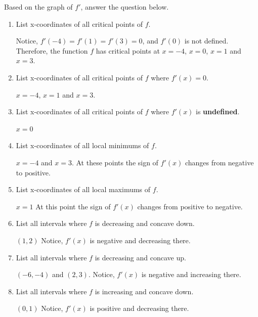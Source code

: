 \documentclass{ximera}
\begin{document}
\begin{problem}
	Based on the graph of $f'$, answer  the question below.\\
	\begin{enumerate}
		\item List x-coordinates of all critical points of $f$.
		\begin{explanation}
			Notice, $f'(-4)=f'(1)=f'(3)=0$, and $f'(0)$ is not defined. Therefore, the function $f$ has critical points at
			$x=-4$, $x=0$,  $x=1$ and  $x=3$.  
			\end{explanation}
		
		\item List x-coordinates of all critical points of $f$ where $f'(x)=0$.\\ 
		\begin{explanation}
			$x=-4$, $x=1$ and  $x=3$.  
			\end{explanation}
		\item List x-coordinates of all critical points of $f$ where $f'(x)$ is \textbf{undefined}.
		\begin{explanation}
			$x=0$  
			\end{explanation}
		\item List x-coordinates of all local minimums of $f$. 
		\begin{explanation}
			$x=-4$ and $x=3$. 
			At these points the sign of $f'(x)$ changes from negative to positive. 
			\end{explanation}
		\item List x-coordinates of all local maximums of $f$. 
		\begin{explanation}
			 $x=1$
			 At this point the sign of $f'(x)$ changes from positive to  negative. 
			\end{explanation}
		\item List all intervals where $f$ is decreasing and concave down.
		\begin{explanation}
			$(1,2)$  
			Notice, $f'(x)$ is negative and decreasing there. 
			\end{explanation}
		\item List all intervals where $f$ is decreasing and concave up.
		\begin{explanation}
			$(-6,-4)$ and $(2,3)$.  
			Notice, $f'(x)$ is negative and increasing there. 
			\end{explanation}
		\item List all intervals where $f$ is increasing and concave down.
		\begin{explanation}
			$(0,1)$ 
			Notice, $f'(x)$ is positive and decreasing there. 

\end{explanation}
\end{enumerate}
\end{problem}
\end{document}
